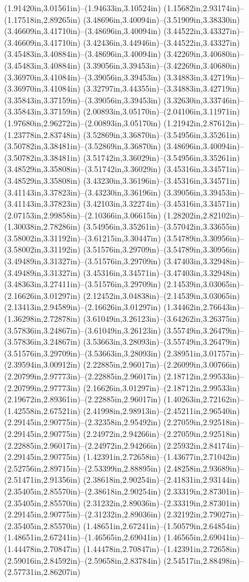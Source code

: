 (1.91420in,3.01561in)--(1.94633in,3.10524in) (1.15682in,2.93174in)--(1.17518in,2.89265in) (3.48696in,3.40094in)--(3.51909in,3.38330in) (3.46609in,3.41710in)--(3.48696in,3.40094in) (3.44522in,3.43327in)--(3.46609in,3.41710in) (3.42436in,3.44946in)--(3.44522in,3.43327in) (3.45483in,3.40884in)--(3.48696in,3.40094in) (3.42269in,3.40680in)--(3.45483in,3.40884in) (3.39056in,3.39453in)--(3.42269in,3.40680in) (3.36970in,3.41084in)--(3.39056in,3.39453in) (3.34883in,3.42719in)--(3.36970in,3.41084in) (3.32797in,3.44355in)--(3.34883in,3.42719in) (3.35843in,3.37159in)--(3.39056in,3.39453in) (3.32630in,3.33746in)--(3.35843in,3.37159in) (2.00893in,3.05170in)--(2.04106in,3.11971in) (1.97680in,2.96272in)--(2.00893in,3.05170in) (1.21942in,2.87612in)--(1.23778in,2.83748in) (3.52869in,3.36870in)--(3.54956in,3.35261in) (3.50782in,3.38481in)--(3.52869in,3.36870in) (3.48696in,3.40094in)--(3.50782in,3.38481in) (3.51742in,3.36029in)--(3.54956in,3.35261in) (3.48529in,3.35808in)--(3.51742in,3.36029in) (3.45316in,3.34571in)--(3.48529in,3.35808in) (3.43230in,3.36196in)--(3.45316in,3.34571in) (3.41143in,3.37823in)--(3.43230in,3.36196in) (3.39056in,3.39453in)--(3.41143in,3.37823in) (3.42103in,3.32274in)--(3.45316in,3.34571in) (2.07153in,2.99858in)--(2.10366in,3.06615in) (1.28202in,2.82102in)--(1.30038in,2.78286in) (3.54956in,3.35261in)--(3.57042in,3.33655in) (3.58002in,3.31192in)--(3.61215in,3.30447in) (3.54789in,3.30956in)--(3.58002in,3.31192in) (3.51576in,3.29709in)--(3.54789in,3.30956in) (3.49489in,3.31327in)--(3.51576in,3.29709in) (3.47403in,3.32948in)--(3.49489in,3.31327in) (3.45316in,3.34571in)--(3.47403in,3.32948in) (3.48363in,3.27411in)--(3.51576in,3.29709in) (2.14539in,3.03065in)--(2.16626in,3.01297in) (2.12452in,3.04838in)--(2.14539in,3.03065in) (2.13413in,2.94589in)--(2.16626in,3.01297in) (1.34462in,2.76643in)--(1.36298in,2.72878in) (3.61049in,3.26123in)--(3.64262in,3.26375in) (3.57836in,3.24867in)--(3.61049in,3.26123in) (3.55749in,3.26479in)--(3.57836in,3.24867in) (3.53663in,3.28093in)--(3.55749in,3.26479in) (3.51576in,3.29709in)--(3.53663in,3.28093in) (2.38951in,3.01757in)--(2.39594in,3.00912in) (2.22885in,2.96017in)--(2.26099in,3.00766in) (2.20799in,2.97773in)--(2.22885in,2.96017in) (2.18712in,2.99533in)--(2.20799in,2.97773in) (2.16626in,3.01297in)--(2.18712in,2.99533in) (2.19672in,2.89361in)--(2.22885in,2.96017in) (1.40263in,2.72162in)--(1.42558in,2.67521in) (2.41998in,2.98913in)--(2.45211in,2.96540in) (2.29145in,2.90775in)--(2.32358in,2.95492in) (2.27059in,2.92518in)--(2.29145in,2.90775in) (2.24972in,2.94266in)--(2.27059in,2.92518in) (2.22885in,2.96017in)--(2.24972in,2.94266in) (2.25932in,2.84174in)--(2.29145in,2.90775in) (1.42391in,2.72658in)--(1.43677in,2.71042in) (2.52756in,2.89715in)--(2.53399in,2.88895in) (2.48258in,2.93689in)--(2.51471in,2.91356in) (2.38618in,2.90254in)--(2.41831in,2.93144in) (2.35405in,2.85570in)--(2.38618in,2.90254in) (2.33319in,2.87301in)--(2.35405in,2.85570in) (2.31232in,2.89036in)--(2.33319in,2.87301in) (2.29145in,2.90775in)--(2.31232in,2.89036in) (2.32192in,2.79027in)--(2.35405in,2.85570in) (1.48651in,2.67241in)--(1.50579in,2.64854in) (1.48651in,2.67241in)--(1.46565in,2.69041in) (1.46565in,2.69041in)--(1.44478in,2.70847in) (1.44478in,2.70847in)--(1.42391in,2.72658in) (2.59016in,2.84592in)--(2.59658in,2.83784in) (2.54517in,2.88498in)--(2.57731in,2.86207in) 